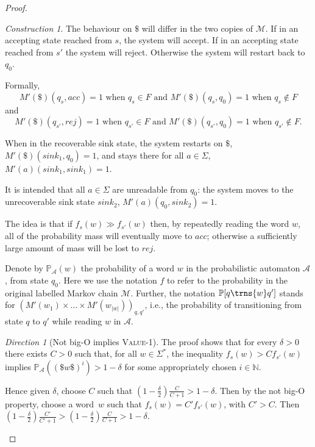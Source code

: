 \documentclass[10pt,a4paper]{amsart}
\numberwithin{equation}{section}
\theoremstyle{plain}
\theoremstyle{definition}
\theoremstyle{remark}
\newtheorem{dir}{Direction}
\newtheorem{construction}[thm]{Construction}
\newcommand\acc{\mathit{acc}}
\newcommand\rej{\mathit{rej}}
\newcommand\sink{\mathit{sink}}
\newcommand\lmc{\mathcal{M}}
\newcommand\pr{\mathbb{P}}
\newcommand\pa{\mathcal{A}}
\renewcommand\nu{f}
\begin{document}
\begin{proof}
\begin{construction}
The behaviour on $\$$ will differ in the two copies of $\lmc$. If in an accepting state reached from $s$, the system will accept. If in an accepting state reached from $s'$ the system will reject. Otherwise the system will restart back to $q_0$.

Formally,
\[
M'(\$)(q_s,\acc) = 1 \text{ when } q_s\in F  \text{ and }  M'(\$)(q_s,q_0) = 1\text{ when } q_s\not\in F
\] and
\[
M'(\$)(q_{s'},\rej)= 1 \text{ when } q_{s'}\in F  \text{ and }  M'(\$)(q_{s'},q_0)= 1 \text{ when } q_{s'}\not\in F.
\]

When in the recoverable sink state, the system restarts on $\$$, $M'(\$)(\sink_1,q_0) = 1$, and stays there for all $a\in\Sigma$, $M'(a)(\sink_1,\sink_1) = 1$.

It is intended that all $a\in\Sigma$ are unreadable from $q_0$: the system moves to the unrecoverable sink state $\sink_2$, $M'(a)(q_0,\sink_2) = 1$.

The idea is that if $\nu_s(w) \gg \nu_{s'}(w)$ then, by repeatedly reading  the word $w$, all of the probability mass will eventually move to $\acc$; otherwise a sufficiently large amount of mass will be lost to $\rej$.

Denote by $\pr_\pa(w)$ the probability of a word $w$ in the probabilistic automaton $\pa$, from state $q_0$. Here we use the notation $\nu$ to refer to the probability in the original labelled Markov chain $\lmc$. Further, the notation $\pr[q \trns{w} q']$ stands for $\left(M'(w_1)\times \dots \times M'(w_{|w|})\right)_{q,q'}$, i.e., the probability of transitioning from state $q$ to $q'$ while reading $w$ in $\pa$.
\end{construction}

\begin{dir}[Not big-O implies \textsc{Value-1}]

The proof shows that for every $\delta>0$ there exists $C > 0$ such that, for all $w\in\Sigma^*$, the inequality $\nu_s(w) > C \nu_{s'}(w) $ implies $\pr_\pa((\$w\$)^i) > 1-\delta$ for some appropriately chosen $i \in \mathbb{N}$.

Hence given $\delta$,  choose $C$ such that $(1-\frac{\delta}{2})\frac{C}{C+1} > 1-\delta$. Then by the not big-O property, choose a word~$w$ such that $\nu_s(w) = C' \nu_{s'}(w)$, with $C' > C$. Then $(1-\frac{\delta}{2})\frac{C'}{C'+1} >(1-\frac{\delta}{2})\frac{C}{C+1} > 1-\delta$.


\end{dir}
\end{proof}
\end{document}
